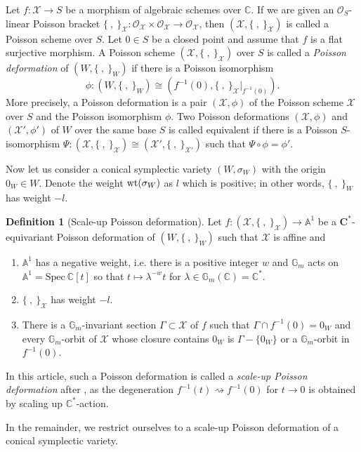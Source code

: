 \documentclass[12pt,a4paper]{amsart}
\theoremstyle{remark}
\theoremstyle{definition}
\newtheorem{defn}[Thm]{Definition}
\def\C{\mathbb{C}}
\def\G{\mathbb{G}}
\def\A{\mathbb{A}}
\begin{document}
Let $f: \mathcal{X} \to S$ be a morphism of algebraic schemes over $\C$. If we are given an $\mathcal{O}_S$-linear Poisson bracket $\{\:, \:\}_{\mathcal{X}} : \mathcal{O}_{\mathcal X} \times \mathcal{O}_{\mathcal X} \to \mathcal{O}_{\mathcal X}$, then 
$(\mathcal{X}, \{\:, \:\}_{\mathcal{X}})$ is called a Poisson scheme over $S$. Let $0 \in S$ be a closed point and assume that 
$f$ is a flat surjective morphism. A Poisson scheme $(\mathcal{X}, \{\:, \:\}_{\mathcal X})$ over $S$ is called a 
{\it Poisson deformation} of $(W, \{\:, \:\}_W)$ if there is a Poisson isomorphism $$\phi\colon (W, \{\:, \:\}_W) \cong (f^{-1}(0), \{\:, \:\}_{\mathcal X}\vert_{f^{-1}(0)}).$$ More precisely, a Poisson deformation is a pair $(\mathcal{X}, \phi)$ of the Poisson scheme $\mathcal{X}$ over $S$ and the Poisson isomorphism $\phi$. Two Poisson deformations $(\mathcal{X}, \phi)$ and $(\mathcal{X}', \phi')$ of $W$ over the same base $S$ is called equivalent if there is a Poisson $S$-isomorphism $\Psi\colon (\mathcal{X}, \{\:, \:\}_{\mathcal X}) \cong (\mathcal{X}', \{\:, \:\}_{\mathcal{X}'})$ such that $\Psi \circ \phi = \phi'$.  
\vspace{0.2cm}

Now let us consider a conical symplectic variety $(W, \sigma_W)$ with the origin $0_W \in W$. Denote the weight ${\rm wt}(\sigma_W)$ as $l$ which is positive; in other words, $\{\:, \:\}_W$ has weight $-l$. 
\begin{defn}[Scale-up Poisson deformation]\label{def:SPD}
Let  
$f\colon (\mathcal{X}, \{\:, \:\}_{\mathcal X}) \to \A^1$ be a $\mathbf{C}^*$-equivariant Poisson deformation of $(W, \{\:, \:\}_W)$
such that $\mathcal{X}$ is affine and  
\begin{enumerate}[label=\arabic*)]\label{SUPD}
\item  $\A^1$ has a negative weight, i.e. there is a positive integer $w$ and $\G_m$ acts on $\A^1 = \mathrm{Spec}\: \C[t]$ 
so that 
$t \mapsto \lambda^{-w}t$  for $\lambda \in \G_m(\C)=\C^*$. 

\item  $\{\:, \:\}_{\mathcal X}$ has weight $-l$. 

\item  \label{SUPD.pos} There is a $\G_m$-invariant section $\Gamma \subset \mathcal{X}$ of $f$ 
such that $\Gamma \cap f^{-1}(0) = 0_W$ and every 
$\G_m$-orbit of $\mathcal{X}$ whose closure contains $0_W$ is $\Gamma -\{0_W\}$ or a $\G_m$-orbit in $f^{-1}(0)$.
\end{enumerate}
\vspace{0.2cm}

In this article, such a Poisson deformation is called a {\em scale-up Poisson deformation} after \cite[\S 2]{Od24b}, as 
the degeneration $f^{-1}(t)\rightsquigarrow f^{-1}(0)$ for $t\to 0$ 
is obtained by scaling up $\C^*$-action. 
\end{defn}
In the remainder, we restrict ourselves to a scale-up Poisson deformation of a conical symplectic variety. 
\end{document}
